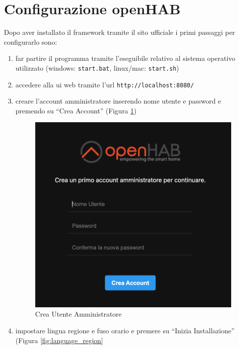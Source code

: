 \section{Configurazione openHAB}
Dopo aver installato il framework tramite il sito ufficiale i primi passaggi per configurarlo sono:
\begin{enumerate}
    \item far partire il programma tramite l'eseguibile relativo al sistema operativo utilizzato (windows: \texttt{start.bat}, linux/mac: \texttt{start.sh})
    \item accedere alla ui web tramite l'url \texttt{http://localhost:8080/}
    \item creare l'account amministratore inserendo nome utente e password e premendo su ``Crea Account'' (Figura \ref{fig:create_admin})
    \begin{figure}
        \centering
        \includegraphics[width=12cm]{Immagini/create_admin}
        \caption{Crea Utente Amministratore}
        \label{fig:create_admin}
    \end{figure}
    \item impostare lingua regione e fuso orario e premere su ``Inizia Installazione'' (Figura \ref{fig:language_region}
    \begin{figure}
        \centering

\end{figure}
\end{enumerate}
